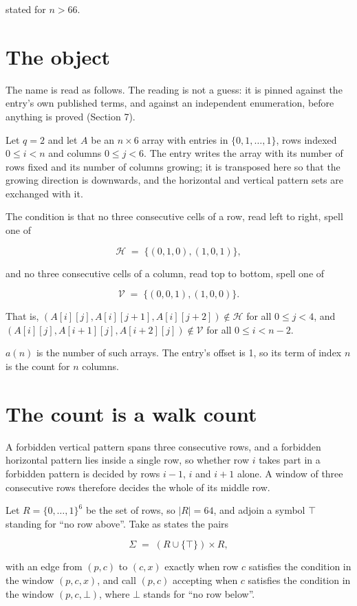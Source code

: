 \documentclass[11pt]{article}
\theoremstyle{definition}
\begin{document}
stated for $n > 66$.

\section{The object}

The name is read as follows. The reading is not a guess: it is pinned against the entry's own published terms, and against an independent enumeration, before anything is proved (Section 7).

Let $q = 2$ and let $A$ be an $n \times 6$ array with entries in $\{0,1,\dots,1\}$, rows indexed $0 \le i < n$ and columns $0 \le j < 6$. The entry writes the array with its number of rows fixed and its number of columns growing; it is transposed here so that the growing direction is downwards, and the horizontal and vertical pattern sets are exchanged with it.

The condition is that no three consecutive cells of a row, read left to right, spell one of

\[\mathcal{H} \;=\; \{(0,1,0), (1,0,1)\},\]

and no three consecutive cells of a column, read top to bottom, spell one of

\[\mathcal{V} \;=\; \{(0,0,1), (1,0,0)\}.\]

That is, $(A[i][j],A[i][j{+}1],A[i][j{+}2]) \notin \mathcal{H}$ for all $0 \le j < 4$, and $(A[i][j],A[i{+}1][j],A[i{+}2][j]) \notin \mathcal{V}$ for all $0 \le i < n-2$.

$a(n)$ is the number of such arrays. The entry's offset is 1, so its term of index $n$ is the count for $n$ columns.

\section{The count is a walk count}

A forbidden vertical pattern spans three consecutive rows, and a forbidden horizontal pattern lies inside a single row, so whether row $i$ takes part in a forbidden pattern is decided by rows $i-1$, $i$ and $i+1$ alone. A window of three consecutive rows therefore decides the whole of its middle row.

Let $R = \{0,\dots,1\}^{6}$ be the set of rows, so $|R| = 64$, and adjoin a symbol $\top$ standing for ``no row above''. Take as states the pairs

\[\Sigma \;=\; (R \cup \{\top\}) \times R,\]

with an edge from $(p,c)$ to $(c,x)$ exactly when row $c$ satisfies the condition in the window $(p,c,x)$, and call $(p,c)$ accepting when $c$ satisfies the condition in the window $(p,c,\bot)$, where $\bot$ stands for ``no row below''.
\end{document}
